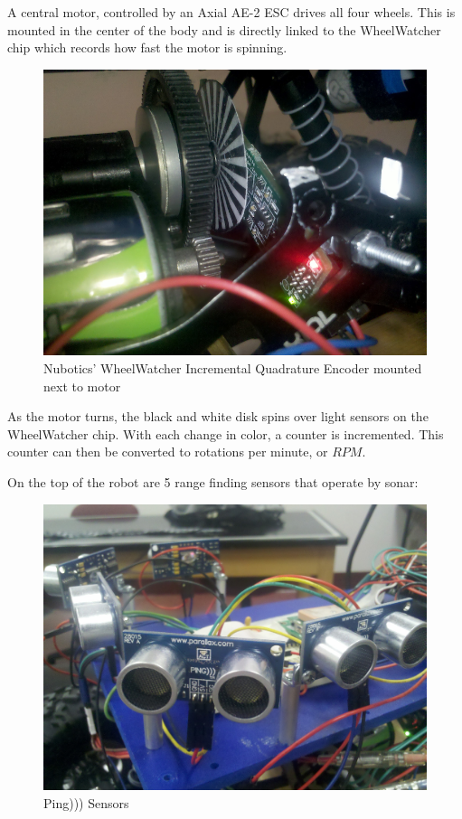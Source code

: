 \documentclass[12pt]{article}
\begin{document}
A central motor, controlled by an Axial AE-2 ESC drives all four wheels.  This is mounted in the center of the body and is directly linked to the WheelWatcher chip which records how fast the motor is spinning.
\begin{figure}[h]
\centerline{\includegraphics{img/wheelwatcher}}
\caption{Nubotics' WheelWatcher Incremental Quadrature Encoder mounted next to motor}
\end{figure}

As the motor turns, the black and white disk spins over light sensors on the WheelWatcher chip.  With each change in color, a counter is incremented.  This counter can then be converted to rotations per minute, or $RPM$.

On the top of the robot are 5 range finding sensors that operate by sonar:
\begin{figure}[h]
\centerline{\includegraphics[scale=.8]{img/rangeSensors}}
\caption{Ping))) Sensors}
\end{figure}
\end{document}
